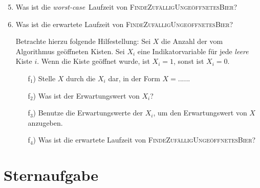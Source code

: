 \documentclass{uebung_cs}
\begin{document}
\begin{exercise}[Bierkisten]
	\begin{enumerate}
		\setcounter{enumi}{4}
		\item Was ist die \textit{worst-case}~Laufzeit von \textsc{FindeZufälligUngeöffnetesBier}?
		\item Was ist die erwartete Laufzeit von \textsc{FindeZufälligUngeöffnetesBier}?
		\item[] Betrachte hierzu folgende Hilfestellung: Sei $X$ die Anzahl der vom Algorithmus geöffneten Kisten. Sei $X_i$ eine Indikatorvariable für jede \emph{leere} Kiste $i$. Wenn die Kiste geöffnet wurde, ist $X_i = 1$, sonst ist $X_i = 0$. 
		\begin{itemize}[topsep=0.21cm, leftmargin=1.2cm]
			\item[f$_1$)] Stelle $X$ durch die $X_i$ dar, in der Form $X = .....$.
			\item[f$_2$)] Was ist der Erwartungswert von $X_i$?
			\item[f$_3$)] Benutze die Erwartungswerte der $X_i$, um den Erwartungswert von $X$ anzugeben.
			\item[f$_4$)] Was ist die erwartete Laufzeit von \textsc{FindeZufälligUngeöffnetesBier}?
		\end{itemize}
	\end{enumerate}
\end{exercise}

\newpage
\section*{Sternaufgabe}
\end{document}
